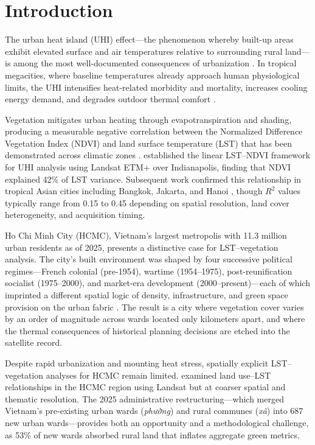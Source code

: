 \documentclass[preprint,12pt]{elsarticle}
\begin{document}
\linenumbers

\section{Introduction}
\label{sec:intro}

The urban heat island (UHI) effect---the phenomenon whereby built-up areas exhibit elevated surface and air temperatures relative to surrounding rural land---is among the most well-documented consequences of urbanization \citep{oke1982,arnfield2003}. In tropical megacities, where baseline temperatures already approach human physiological limits, the UHI intensifies heat-related morbidity and mortality, increases cooling energy demand, and degrades outdoor thermal comfort \citep{tan2010,mora2017}.

Vegetation mitigates urban heating through evapotranspiration and shading, producing a measurable negative correlation between the Normalized Difference Vegetation Index (NDVI) and land surface temperature (LST) that has been demonstrated across climatic zones \citep{weng2004,yuan2007,li2013}. \citet{weng2004} established the linear LST--NDVI framework for UHI analysis using Landsat ETM+ over Indianapolis, finding that NDVI explained 42\% of LST variance. Subsequent work confirmed this relationship in tropical Asian cities including Bangkok, Jakarta, and Hanoi \citep{estoque2017,hua2021}, though $R^2$ values typically range from 0.15 to 0.45 depending on spatial resolution, land cover heterogeneity, and acquisition timing.

Ho Chi Minh City (HCMC), Vietnam's largest metropolis with 11.3 million urban residents as of 2025, presents a distinctive case for LST--vegetation analysis. The city's built environment was shaped by four successive political regimes---French colonial (pre-1954), wartime (1954--1975), post-reunification socialist (1975--2000), and market-era development (2000--present)---each of which imprinted a different spatial logic of density, infrastructure, and green space provision on the urban fabric \citep{waibel2006}. The result is a city where vegetation cover varies by an order of magnitude across wards located only kilometers apart, and where the thermal consequences of historical planning decisions are etched into the satellite record.

Despite rapid urbanization and mounting heat stress, spatially explicit LST--vegetation analyses for HCMC remain limited. \citet{tran2017} examined land use--LST relationships in the HCMC region using Landsat but at coarser spatial and thematic resolution. The 2025 administrative restructuring---which merged Vietnam's pre-existing urban wards (\textit{phường}) and rural communes (\textit{xã}) into 687 new urban wards---provides both an opportunity and a methodological challenge, as 53\% of new wards absorbed rural land that inflates aggregate green metrics.
\end{document}

